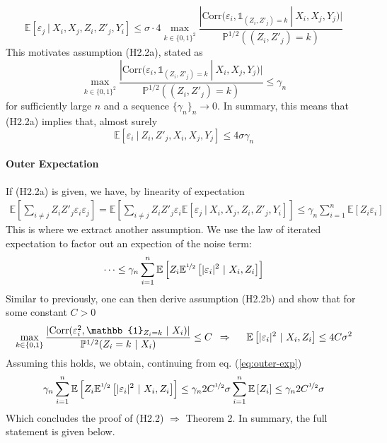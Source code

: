 \documentclass[10pt]{article}
\theoremstyle{definition}
\begin{document}
$$
\mathbb{E}\left[ \varepsilon_{j} ~|~ X_{i}, X_{j}, Z_{i}, Z'_{j}, Y_{i} \right] 
 \leq \sigma \cdot 4 \max_{k \in \{ 0,1 \}^2} \frac{|\text{Corr}(\varepsilon_{i}, \mathbb{1}_{(Z_i, Z'_j)=k} ~|~ X_{i}, X_{j}, Y_{j})|}{
\mathbb{P}^{1/2}({(Z_i, Z'_j)=k} )
}
$$
This motivates assumption (H2.2a), stated as
$$
\max_{k \in \{ 0,1 \}^2} \frac{|\text{Corr}(\varepsilon_{i}, \mathbb{1}_{(Z_i, Z'_j)=k} ~|~ X_{i}, X_{j}, Y_{j})|}{
\mathbb{P}^{1/2}({(Z_i, Z'_j)=k} )}
\leq \gamma_{n}
$$
for sufficiently large $n$ and a sequence $\{\gamma_{n}\}_n \to 0$. In summary,
this means that (H2.2a) implies that, almost surely
$$
\mathbb{E}\left[ \varepsilon_i ~|~ Z_i, Z'_j, X_i, X_j, Y_j \right] \leq 4
\sigma \gamma_n
$$


\paragraph{Outer Expectation} If (H2.2a) is given, we have, by linearity of expectation
\begin{align}
 \mathbb{E}\left[ \sum_{i \not= j} Z_{i} Z'_{j} \varepsilon_{i} \varepsilon_{j} \right]  = 
  \mathbb{E}\left[ \sum_{i \not= j} Z_{i} Z'_{j} \varepsilon_{i} 
   \mathbb{E}\left[ \varepsilon_{j} ~|~ X_{i}, X_{j}, Z_{i}, Z'_{j}, Y_{i} \right] 
   \right] 
   \leq \gamma_{n} \sum_{i=1}^n  \mathbb{E}\left[ Z_{i} \varepsilon_{i} \right] 
   \label{eq:outer-exp}
\end{align}
This is where we extract another assumption. We
use the law of iterated expectation to factor out an expection of the noise
term:
$$
\dots \leq \gamma_{n} \sum_{i=1}^n  \mathbb{E}\left[ Z_i  \mathbb{E}^{\nicefrac{1}{2}}\left[ |\varepsilon_{i}|^2 ~|~ X_{i}, Z_{i} \right]  \right] 
$$
Similar to previously, one can then derive assumption (H2.2b) and show that for
some constant $C > 0$
$$
\max_{k \in \{ 0,1 \}} \frac{|\text{Corr}(\varepsilon_{i}^2, \mathbb{1}_{Z_{i}=k} ~|~ X_{i})|}{
\mathbb{P}^{1/2}(Z_{i}=k ~|~ X_{i})
}
\leq C
\hspace{0.5em} \Rightarrow \hspace{0.5cm}
 \mathbb{E}\left[ |\varepsilon_{i}|^2 ~|~ X_{i}, Z_{i} \right] \leq 4C \sigma^2
$$
Assuming this holds, we obtain, continuing from eq. (\ref{eq:outer-exp})
$$
\gamma_{n} \sum_{i=1}^n \mathbb{E}\left[ Z_i \mathbb{E}^{\nicefrac{1}{2}}\left[
    |\varepsilon_{i}|^2 ~|~ X_{i}, Z_{i} \right] \right] \leq \gamma_{n} 2
C^{\nicefrac{1}{2}} \sigma \sum_{i=1}^n \mathbb{E}\left[ Z_{i} \right] \leq \gamma_{n} 2
C^{\nicefrac{1}{2}} \sigma
$$
Which concludes the proof of (H2.2) $\Rightarrow$ Theorem 2. In summary, the
full statement is given below.
\end{document}
